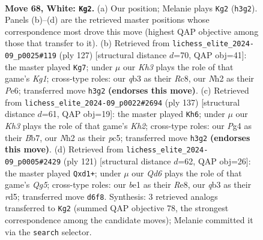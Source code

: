 \documentclass[11pt]{article}
\begin{document}
\clearpage

\begin{figure}[p]\centering
\begin{subfigure}{0.46\textwidth}\centering
\resizebox{\linewidth}{!}{%
\newchessgame
\chessboard[
  setfen={5rr1/p5p1/3Q3p/1k1p3P/p2P2P1/1q2P2K/7N/4b3 w - - 44 68},
  showmover=false,
  pgfstyle=straightmove, color=movearrow, markmove={h3-g2}
]}
\caption{}
\end{subfigure}\hfill
\begin{subfigure}{0.46\textwidth}\centering
\resizebox{\linewidth}{!}{%
\newchessgame
\chessboard[
  setfen={2r3k1/5p2/2P1p1p1/4q1Pn/4P3/2R1QK2/2R5/8 b - - 4 64},
  showmover=false,
  pgfstyle=straightmove, color=movearrow, markmove={g8-g7}
]}
\caption{}
\end{subfigure}
\\[4pt]
\begin{subfigure}{0.46\textwidth}\centering
\resizebox{\linewidth}{!}{%
\newchessgame
\chessboard[
  setfen={8/1b4pk/4p3/1pP1P1pP/1P3qP1/6R1/7K/4Q3 b - - 5 69},
  showmover=false,
  pgfstyle=straightmove, color=movearrow, markmove={h7-h6}
]}
\caption{}
\end{subfigure}\hfill
\begin{subfigure}{0.46\textwidth}\centering
\resizebox{\linewidth}{!}{%
\newchessgame
\chessboard[
  setfen={4rk2/5p2/p6p/3R2p1/P1p3q1/2P3P1/1P3P2/3Q2K1 b - - 1 61},
  showmover=false,
  pgfstyle=straightmove, color=movearrow, markmove={g4-d1}
]}
\caption{}
\end{subfigure}
\caption{\textbf{Move 68, White: \texttt{Kg2}.} (a) Our position; Melanie plays \texttt{Kg2} (\texttt{h3g2}). Panels (b)--(d) are the retrieved master positions whose correspondence most drove this move (highest QAP objective among those that transfer to it). (b) Retrieved from \texttt{lichess\_elite\_2024-09\_p0025\#119} (ply 127) [structural distance $d$=70, QAP obj=41]: the master played \texttt{Kg7}; under $\mu$ our \emph{Kh3} plays the role of that game's \emph{Kg1}; cross-type roles: our \emph{q}b3 as their \emph{R}c8, our \emph{N}h2 as their \emph{P}e6; transferred move \texttt{h3g2} \textbf{(endorses this move)}. (c) Retrieved from \texttt{lichess\_elite\_2024-09\_p0022\#2694} (ply 137) [structural distance $d$=61, QAP obj=19]: the master played \texttt{Kh6}; under $\mu$ our \emph{Kh3} plays the role of that game's \emph{Kh2}; cross-type roles: our \emph{P}g4 as their \emph{B}b7, our \emph{N}h2 as their \emph{p}c5; transferred move \texttt{h3g2} \textbf{(endorses this move)}. (d) Retrieved from \texttt{lichess\_elite\_2024-09\_p0005\#2429} (ply 121) [structural distance $d$=62, QAP obj=26]: the master played \texttt{Qxd1+}; under $\mu$ our \emph{Qd6} plays the role of that game's \emph{Qg5}; cross-type roles: our \emph{b}e1 as their \emph{R}e8, our \emph{q}b3 as their \emph{r}d5; transferred move \texttt{d6f8}. Synthesis: 3 retrieved analogs transferred to \texttt{Kg2} (summed QAP objective 78, the strongest correspondence among the candidate moves); Melanie committed it via the \texttt{search} selector.}
\label{fig:thought-m134}
\end{figure}
\end{document}
